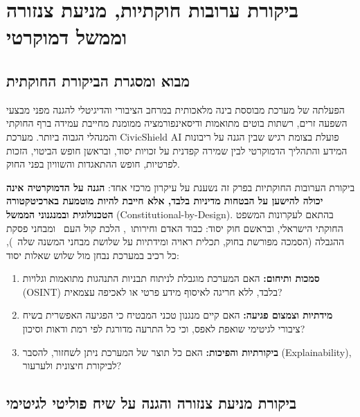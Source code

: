
\chapter{ביקורת ערובות חוקתיות, מניעת צנזורה וממשל דמוקרטי}
\label{ch:safeguards_audit}

\section{מבוא ומסגרת הביקורת החוקתית}
\label{sec:constitutional_framework}

הפעלתה של מערכת מבוססת בינה מלאכותית במרחב הציבורי והדיגיטלי להגנה מפני מבצעי השפעה זרים, רשתות בוטים מתואמות ודיסאינפורמציה ממומנת מחייבת עמידה ברף החוקתי והמנהלי הגבוה ביותר. מערכת \textenglish{CivicShield AI} פועלת בצומת רגיש שבין הגנה על ריבונות המידע והתהליך הדמוקרטי לבין שמירה קפדנית על זכויות יסוד, ובראשן חופש הביטוי, הזכות לפרטיות, חופש ההתאגדות והשוויון בפני החוק.

ביקורת הערובות החוקתיות בפרק זה נשענת על עיקרון מרכזי אחד: \textbf{הגנה על הדמוקרטיה אינה יכולה להישען על הבטחות מדיניות בלבד, אלא חייבת להיות מוטמעת בארכיטקטורה הטכנולוגית ובמנגנוני הממשל} (\textenglish{Constitutional-by-Design}). בהתאם לעקרונות המשפט החוקתי הישראלי, ובראשם חוק יסוד: כבוד האדם וחירותו~\cite{basiclaw1992}, הלכת קול העם~\cite{kolhaam1953} ומבחני פסקת ההגבלה (הסמכה מפורשת בחוק, תכלית ראויה ומידתיות על שלושת מבחני המשנה שלה~\cite{barak2012proportionality}), כל רכיב במערכת נבחן מול שלוש שאלות יסוד:
\begin{enumerate}
    \item \textbf{סמכות ותיחום:} האם המערכת מוגבלת לניתוח תבניות התנהגות מתואמות וגלויות (\textenglish{OSINT}) בלבד, ללא חריגה לאיסוף מידע פרטי או לאכיפה עצמאית?
    \item \textbf{מידתיות וצמצום פגיעה:} האם קיים מנגנון טכני המבטיח כי הפגיעה האפשרית בשיח ציבורי לגיטימי שואפת לאפס, וכי כל התרעה מדורגת לפי רמת ודאות וסיכון?
    \item \textbf{ביקורתיות והפיכות:} האם כל תוצר של המערכת ניתן לשחזור, להסבר (\textenglish{Explainability}), לביקורת חיצונית ולערעור?
\end{enumerate}

\section{ביקורת מניעת צנזורה והגנה על שיח פוליטי לגיטימי}
\label{sec:anti_censorship}

